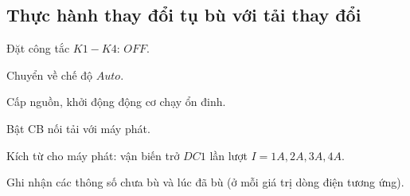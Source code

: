 \documentclass[13pt,a4paper]{extarticle}
\begin{document}
\subsection{Thực hành thay đổi tụ bù với tải thay đổi}
\begin{list}{--}{}
\item Đặt công tắc $K1-K4$: $OFF$.
\item Chuyển về chế độ $Auto$.
\item Cấp nguồn, khởi động động cơ chạy ổn đinh.
\item Bật CB nối tải với máy phát.
\item Kích từ cho máy phát: vận biến trở $DC1$ lần lượt $I=1A,2A,3A,4A$.
\item Ghi nhận các thông số chưa bù và lúc đã bù (ở mỗi giá trị dòng điện tương ứng).
\end{list}
\end{document}
